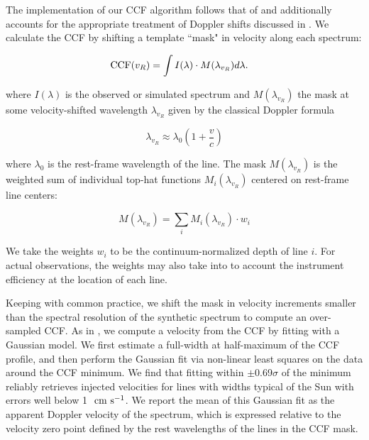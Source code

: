 \documentclass[twocolumn]{aastex63}
\newcommand{\cms}{\ {\rm cm\ s}^{-1}}
\newcommand{\revise}[1]{#1}
\begin{document}
The implementation of our CCF algorithm follows that of \citet{Pepe2002} \revise{and additionally accounts for the appropriate treatment of Doppler shifts discussed in \citet{Wright2019}.} We calculate the CCF by shifting a template ``mask" in velocity along each spectrum: 

\begin{align}
    {\rm CCF}(v_R) &= \int I(\lambda) \cdot M(\lambda_{v_R}) d\lambda.
\end{align}{}

\noindent where $I(\lambda)$ is the observed or simulated spectrum and $M(\lambda_{v_R})$ the mask at some velocity-shifted wavelength $\lambda_{v_R}$ given by the classical Doppler formula

\begin{equation}
    \lambda_{v_R} \approx \lambda_0 \left( 1 + \frac{v}{c} \right)
\end{equation}

\noindent where $\lambda_0$ is the rest-frame wavelength of the line. The mask $M(\lambda_{v_R})$ is the weighted sum of individual top-hat functions $M_i(\lambda_{v_R})$ centered on rest-frame line centers:

\begin{equation}
    M(\lambda_{v_R}) = \sum_i M_i(\lambda_{v_R}) \cdot w_i
\end{equation}{}

\noindent We take the weights $w_i$ to be the continuum-normalized depth of line $i$. For actual observations, the weights may also take into to account the instrument efficiency at the location of each line. \par 

Keeping with common practice, we shift the mask in velocity increments smaller than the spectral resolution of the synthetic spectrum to compute an over-sampled CCF. As in \citet{Pepe2002}, we compute a velocity from the CCF by fitting with a Gaussian model. We first estimate a full-width at half-maximum of the CCF profile, and then perform the Gaussian fit via non-linear least squares on the data around the CCF minimum. We find that fitting within $\pm$0.69$\sigma$ of the minimum reliably retrieves injected velocities for lines with widths typical of the Sun with errors well below 1 $\cms$. We report the mean of this Gaussian fit as the apparent Doppler velocity of the spectrum, which is expressed relative to the velocity zero point defined by the rest wavelengths of the lines in the CCF mask. \par 
\end{document}
